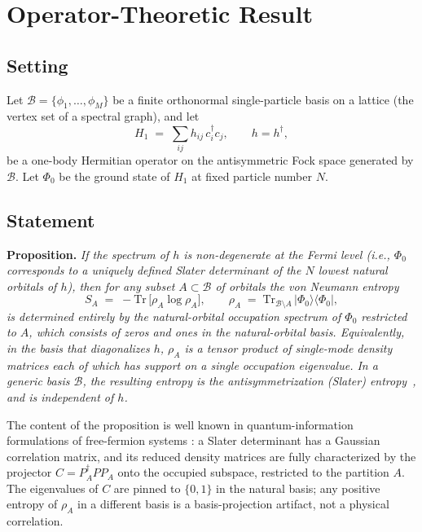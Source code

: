 \documentclass[twocolumn,pra,amsmath,amssymb,superscriptaddress]{revtex4-2}
\begin{document}
\section{Operator-Theoretic Result}
\label{sec:operator}

\subsection{Setting}

Let $\mathcal{B} = \{\phi_1,\ldots,\phi_M\}$ be a finite
orthonormal single-particle basis on a lattice (the vertex set of
a spectral graph), and let
\begin{equation}
  H_1 \;=\; \sum_{ij} h_{ij}\, c_i^{\dagger} c_j,
  \qquad h = h^{\dagger},
  \label{eq:h1}
\end{equation}
be a one-body Hermitian operator on the antisymmetric Fock space
generated by $\mathcal{B}$.  Let $\Phi_0$ be the ground state of
$H_1$ at fixed particle number $N$.

\subsection{Statement}

\noindent\textbf{Proposition.} \emph{If the spectrum of $h$ is
non-degenerate at the Fermi level (i.e., $\Phi_0$ corresponds to
a uniquely defined Slater determinant of the $N$ lowest natural
orbitals of $h$), then for any subset
$A \subset \mathcal{B}$ of orbitals the von Neumann entropy
\begin{equation}
  S_A \;=\; -\mathrm{Tr}\,\bigl[\rho_A \log \rho_A\bigr],
  \qquad
  \rho_A \;=\; \mathrm{Tr}_{\mathcal{B}\setminus A}\,
  \lvert\Phi_0\rangle\langle\Phi_0\rvert,
\end{equation}
is determined entirely by the natural-orbital occupation
spectrum of $\Phi_0$ restricted to $A$, which consists of zeros
and ones in the natural-orbital basis.  Equivalently, in the
basis that diagonalizes $h$, $\rho_A$ is a tensor product of
single-mode density matrices each of which has support on a
single occupation eigenvalue.  In a generic basis $\mathcal{B}$,
the resulting entropy is the antisymmetrization (Slater)
entropy~\cite{GhirardiMarinatto2004}, and is independent of
$h$.}

\medskip
The content of the proposition is well known in
quantum-information formulations of free-fermion systems
\cite{Peschel2003}: a Slater determinant has a Gaussian
correlation matrix, and its reduced density matrices are
fully characterized by the projector $C = P_A^{\dagger} P P_A$
onto the occupied subspace, restricted to the partition $A$.
The eigenvalues of $C$ are pinned to $\{0,1\}$ in the natural
basis; any positive entropy of $\rho_A$ in a different basis is
a basis-projection artifact, not a physical correlation.
\end{document}
